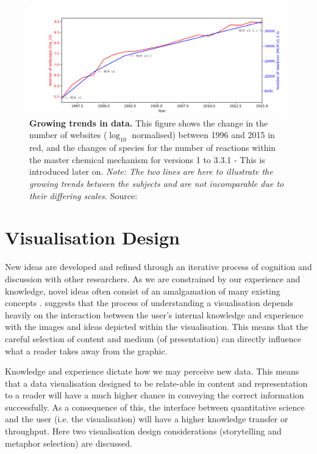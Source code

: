 \begin{figure}[H]
     \centering
         \includegraphics[width=.95\textwidth]{figures_c1/webmcm.png}
         \caption{\textbf{Growing trends in data.} This figure shows the change in the number of websites ($\log_{10}$ normalised) between 1996 and 2015 in red, and the changes of species for the number of reactions within the master chemical mechanism for versions 1 to 3.3.1 - This is introduced later on. \emph{Note: The two lines are here to illustrate the growing trends between the subjects and are not incomparable due to their differing scales.}  Source: \citep{webstats,mcmhist}}
         \label{fig:webmcm}
\end{figure}


\section{Visualisation Design}\label{sec:visdes}


New ideas are developed and refined through an iterative process of cognition and discussion with other researchers\citep{ch7}.
As we are constrained by our experience and knowledge, novel ideas often consist of an amalgamation of many existing concepts \citep{wingedhorse,goodideas}. \citep{shapinginfo} suggests that the process of understanding a visualisation depends heavily on the interaction between the user's internal knowledge and experience with the images and ideas depicted within the visualisation. This means that the careful selection of content and medium (of presentation) can directly influence what a reader takes away from the graphic.

Knowledge and experience dictate how we may perceive new data. This means that a data visualisation designed to be relate-able in content and representation to a reader will have a much higher chance in conveying the correct information successfully. As a consequence of this, the interface between quantitative science and the user (i.e. the visualisation) will have a higher knowledge transfer or throughput. Here two visualisation design considerations (storytelling and metaphor selection) are discussed.



